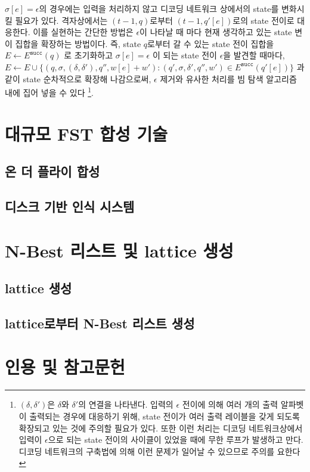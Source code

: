 \documentclass[../main.tex]{subfiles}
\begin{document}
$\sigma[e] = \epsilon$의 경우에는 입력을 처리하지 않고 디코딩 네트워크 상에서의 state를 변화시킬 필요가 있다. 
격자상에서는 $(t-1, q)$로부터 $(t-1, q'[e])$로의 state 전이로 대응한다. 
이를 실현하는 간단한 방법은 $\epsilon$이 나타날 때 마다 현재 생각하고 있는 state 변이 집합을 확장하는 방법이다. 
즉, state $q$로부터 갈 수 있는 state 전이 집합을 $E \leftarrow E^{\texttt{succ}}(q)$ 로 초기화하고 
$\sigma[e] = \epsilon$ 이 되는 state 전이 $\epsilon$을 발견할 때마다, 
$E \leftarrow E \cup \{ ( q, \sigma, (\delta, \delta'), q'', w[e] + w'): (q', \sigma, \delta', q'', w') \in E^{\texttt{succ}}(q'[e])\}$ 과 같이 state 순차적으로 확장해 나감으로써, 
$\epsilon$ 제거와 유사한 처리를 빔 탐색 알고리즘 내에 집어 넣을 수 있다
\footnote{$(\delta, \delta')$은 $\delta$와 $\delta'$의 연결을 나타낸다. 
입력의 $\epsilon$ 전이에 의해 여러 개의 출력 알파벳이 출력되는 경우에 대응하기 위해, state 전이가 여러 출력 레이블을 갖게 되도록 확장되고 있는 것에 주의할 필요가 있다. 또한 이런 처리는 디코딩 네트워크상에서 입력이 $\epsilon$으로 되는 state 전이의 사이클이 있었을 때에 무한 루프가 발생하고 만다. 디코딩 네트워크의 구축법에 의해 이런 문제가 일어날 수 있으므로 주의를 요한다}.



\section{대규모 FST 합성 기술}
\subsection{온 더 플라이 합성}
\subsection{디스크 기반 인식 시스템}

\section{N-Best 리스트 및 lattice 생성}
\subsection{lattice 생성}
\subsection{lattice로부터 N-Best 리스트 생성}

\section*{인용 및 참고문헌}
\end{document}
